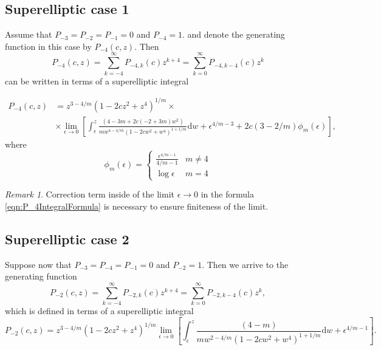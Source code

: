 \documentclass[review,nopreprintline]{elsarticle}
\theoremstyle{definition}
\numberwithin{equation}{section}
\theoremstyle{remark}
\newtheorem{remark}[equation]{Remark}
\begin{document}
	    \subsection{Superelliptic case 1}
	    Assume that $P_{-3}=P_{-2}=P_{-1}=0$ and $P_{-4}=1$. 
	   and denote the generating function in this case by $ P_{-4}(c,z)$. Then 
	    \begin{equation*}
	        P_{-4}(c,z)=\sum _{k=-4}^{\infty }  P_{-4,k}(c)z^{k+4}
	        =\sum _{k=0}^{\infty }P_{-4,k-4}(c) z^{k} 
	    \end{equation*}
	  can be written in terms of a superelliptic integral
	  
	    \begin{align}\label{eqn:P_4IntegralFormula}
	         P_{-4}(c,z)&=z^{3-4/m} (1-2 c z^2+z^4)^{1/m}\times\nonumber\\
	         &\times\lim_{\epsilon\to 0}\left[\int_{\epsilon}^{z} \frac{(4-3 m+2 c(-2+3 m) w^2)}{mw^{4-4/m} (1-2 c w^2+w^4)^{1+1/m}}  \textrm{d}w+\epsilon^{4/m-3}+2c(3-2/m)\phi_m(\epsilon)\right],
	    \end{align}
	    where 
	    \[
	    \phi_m(\epsilon)=
	    \left\{
	\begin{array}{cc}
	    \frac{\epsilon^{4/m-1}}{4/m-1} &  m\neq 4\\
	    \log{\epsilon} &  m=4
	\end{array}
	    \right.
	    \]
	    \begin{remark}
	        Correction term inside of the limit  $\epsilon\to 0$  in the formula \eqref{eqn:P_4IntegralFormula} is necessary to ensure finiteness of the limit.
	    \end{remark}
	    \subsection{Superelliptic case 2}
	    Suppose now that $P_{-3}=P_{-4}=P_{-1}=0$ and $P_{-2}=1$. Then we arrive to the generating function
	    \begin{equation*}
	        P_{-2}(c,z)=\sum _{k=-4}^{\infty }  P_{-2,k}(c)z^{k+4}
	        =\sum _{k=0}^{\infty }P_{-2,k-4}(c) z^{k}, 
	    \end{equation*}
	   which is defined in terms of a superelliptic integral
	    \begin{equation*}
	          P_{-2}(c,z)=z^{3-4/m} (1-2 c z^2+z^4)^{1/m}\lim_{\epsilon\to 0}\left[\int_{\epsilon}^{z} \frac{(4 - m) }{m w^{2-4/m} (1-2 c w^2+w^4)^{1+1/m}}  \textrm{d}w+\epsilon^{4/m-1}\right].
	    \end{equation*}
\end{document}
